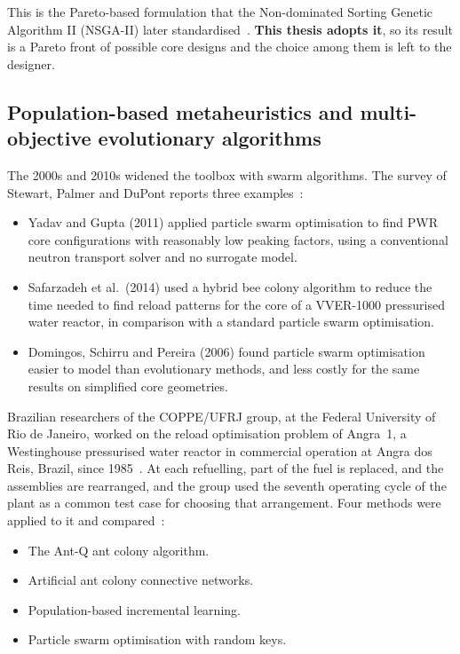 This is the Pareto-based formulation that the Non-dominated Sorting
Genetic Algorithm II (NSGA-II) later standardised~\cite{deb_nsga2_2002}.
\textbf{This thesis adopts it}, so its result is a Pareto front of possible core
designs and the choice among them is left to the designer.

\subsection{Population-based metaheuristics and multi-objective
evolutionary algorithms}
\label{sec:lit-opt-population}

The 2000s and 2010s widened the toolbox with swarm algorithms. The survey
of Stewart, Palmer and DuPont reports three examples~\cite{stewart_2021}:

\begin{itemize}
  \item Yadav and Gupta (2011) applied particle swarm optimisation to
        find PWR core configurations with reasonably low peaking factors,
        using a conventional neutron transport solver and no surrogate
        model.

  \item Safarzadeh et al.\ (2014) used a hybrid bee colony algorithm to
        reduce the time needed to find reload patterns for the core of a
        VVER-1000 pressurised water reactor, in comparison with a standard
        particle swarm optimisation.

  \item Domingos, Schirru and Pereira (2006) found particle swarm
        optimisation easier to model than evolutionary methods, and less
        costly for the same results on simplified core geometries.
\end{itemize}

Brazilian researchers of the COPPE/UFRJ group, at the Federal University
of Rio de Janeiro, worked on the reload optimisation problem of Angra~1,
a Westinghouse pressurised water reactor in commercial operation at Angra
dos Reis, Brazil, since 1985~\cite{eletronuclear_angra1}. At each
refuelling, part of the fuel is replaced, and the assemblies are
rearranged, and the group used the seventh operating cycle of the plant
as a common test case for choosing that arrangement. Four methods were
applied to it and compared~\cite{meneses_2010}:

\begin{itemize}
  \item The Ant-Q ant colony algorithm.

  \item Artificial ant colony connective networks.

  \item Population-based incremental learning.

  \item Particle swarm optimisation with random keys.
\end{itemize}


